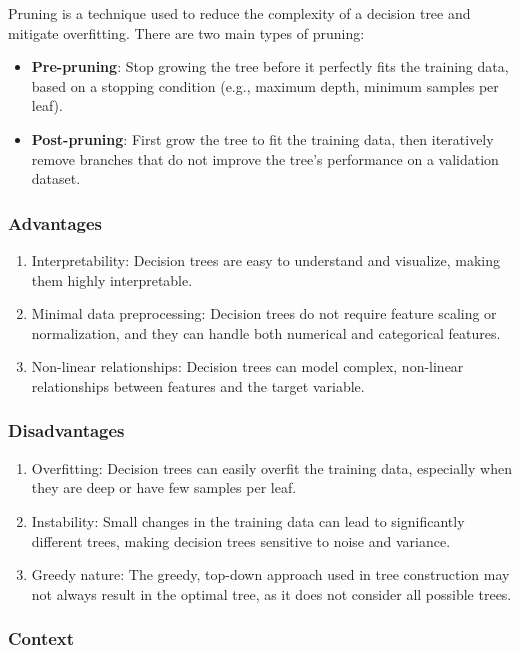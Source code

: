 \documentclass[12pt]{article}
\begin{document}
Pruning is a technique used to reduce the complexity of a decision tree and mitigate overfitting. There are two main types of pruning:

\begin{itemize}
\item \textbf{Pre-pruning}: Stop growing the tree before it perfectly fits the training data, based on a stopping condition (e.g., maximum depth, minimum samples per leaf).
\item \textbf{Post-pruning}: First grow the tree to fit the training data, then iteratively remove branches that do not improve the tree's performance on a validation dataset.
\end{itemize}

\subsubsection{Advantages}
\begin{enumerate}
\item Interpretability: Decision trees are easy to understand and visualize, making them highly interpretable.
\item Minimal data preprocessing: Decision trees do not require feature scaling or normalization, and they can handle both numerical and categorical features.
\item Non-linear relationships: Decision trees can model complex, non-linear relationships between features and the target variable.
\end{enumerate}

\subsubsection{Disadvantages}
\begin{enumerate}
\item Overfitting: Decision trees can easily overfit the training data, especially when they are deep or have few samples per leaf.
\item Instability: Small changes in the training data can lead to significantly different trees, making decision trees sensitive to noise and variance.
\item Greedy nature: The greedy, top-down approach used in tree construction may not always result in the optimal tree, as it does not consider all possible trees.
\end{enumerate}

\subsubsection{Context}
\end{document}
